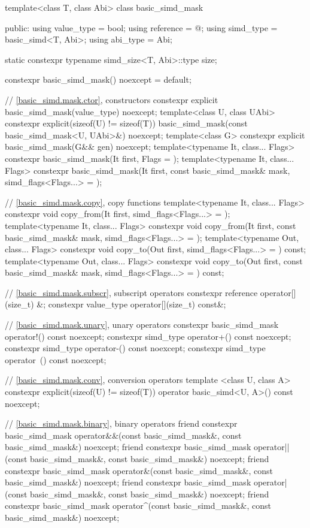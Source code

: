 \begin{codeblock}
template<class T, class Abi> class basic_simd_mask {
public:
  using value_type = bool;
  using reference = @\seebelow@;
  using simd_type = basic_simd<T, Abi>;
  using abi_type = Abi;

  static constexpr typename simd_size<T, Abi>::type size;

  constexpr basic_simd_mask() noexcept = default;

  // \ref{basic_simd.mask.ctor},  constructors
  constexpr explicit basic_simd_mask(value_type) noexcept;
  template<class U, class UAbi>
    constexpr explicit(sizeof(U) != sizeof(T)) basic_simd_mask(const basic_simd_mask<U, UAbi>&) noexcept;
  template<class G> constexpr explicit basic_simd_mask(G&& gen) noexcept;
  template<typename It, class... Flags>
    constexpr basic_simd_mask(It first, Flags = {});
  template<typename It, class... Flags>
    constexpr basic_simd_mask(It first, const basic_simd_mask& mask, simd_flags<Flags...> = {});

  // \ref{basic_simd.mask.copy},  copy functions
  template<typename It, class... Flags>
    constexpr void copy_from(It first, simd_flags<Flags...> = {});
  template<typename It, class... Flags>
    constexpr void copy_from(It first, const basic_simd_mask& mask, simd_flags<Flags...> = {});
  template<typename Out, class... Flags>
    constexpr void copy_to(Out first, simd_flags<Flags...> = {}) const;
  template<typename Out, class... Flags>
    constexpr void copy_to(Out first, const basic_simd_mask& mask, simd_flags<Flags...> = {}) const;

  // \ref{basic_simd.mask.subscr},  subscript operators
  constexpr reference operator[](size_t) &;
  constexpr value_type operator[](size_t) const&;

  // \ref{basic_simd.mask.unary},  unary operators
  constexpr basic_simd_mask operator!() const noexcept;
  constexpr simd_type operator+() const noexcept;
  constexpr simd_type operator-() const noexcept;
  constexpr simd_type operator~() const noexcept;

  // \ref{basic_simd.mask.conv},  conversion operators
  template <class U, class A>
    constexpr explicit(sizeof(U) != sizeof(T)) operator basic_simd<U, A>() const noexcept;

  // \ref{basic_simd.mask.binary},  binary operators
  friend constexpr basic_simd_mask operator&&(const basic_simd_mask&, const basic_simd_mask&) noexcept;
  friend constexpr basic_simd_mask operator||(const basic_simd_mask&, const basic_simd_mask&) noexcept;
  friend constexpr basic_simd_mask operator&(const basic_simd_mask&, const basic_simd_mask&) noexcept;
  friend constexpr basic_simd_mask operator|(const basic_simd_mask&, const basic_simd_mask&) noexcept;
  friend constexpr basic_simd_mask operator^(const basic_simd_mask&, const basic_simd_mask&) noexcept;

}
\end{codeblock}
